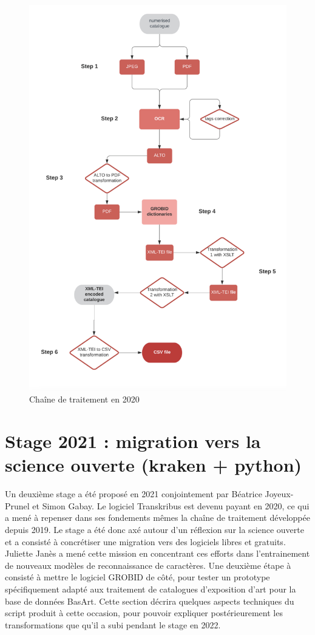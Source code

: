 \documentclass[a4paper,12pt,twoside]{book}
\begin{document}
\begin{figure}
	\centering
	\includegraphics[scale=0.4]{chaine2020}
	\caption{Chaîne de traitement en 2020}
	\label{2020}
\end{figure}



\section{Stage 2021 : migration vers la science ouverte (kraken + python)}
\label{chap:stage2021}

Un deuxième stage a été proposé en 2021 conjointement par Béatrice Joyeux-Prunel et Simon Gabay. Le logiciel Transkribus est devenu payant en 2020, ce qui a mené à repenser dans ses fondements mêmes la chaîne de traitement développée depuis 2019. Le stage a été donc axé autour d'un réflexion sur la science ouverte et a consisté à concrétiser une migration vers des logiciels libres et gratuits. Juliette Janès a mené cette mission en concentrant ces efforts dans l'entrainement de nouveaux modèles de reconnaissance de caractères. Une deuxième étape à consisté à mettre le logiciel GROBID de côté, pour tester un prototype spécifiquement adapté aux traitement de catalogues d'exposition d'art pour la base de données BasArt. Cette section décrira quelques aspects techniques du script produit à cette occasion, pour pouvoir expliquer postérieurement les transformations que qu'il a subi pendant le stage en 2022. 
\end{document}
